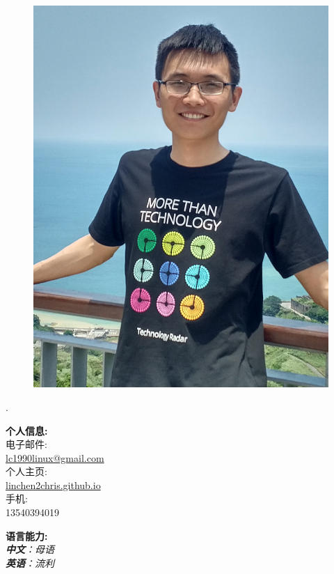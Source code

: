 \documentclass[a4paper,12pt,final]{memoir}
\newcommand{\myThemeColor}{RoyalBlue}
\newcommand{\SmallSep}{\vspace{0.9em}}
\newcommand{\CVItem}[1]
	{\textbf{\color{\myThemeColor} #1}}
\begin{document}
\begin{CJK*}{UTF8}{gbsn}%
\begin{figure}
	\hfill
	\includegraphics[width=0.7\columnwidth]{photo}
	\vspace{-7cm}
\end{figure}
\begin{flushright}\footnotesize
.\\
\vskip 6cm
    \raggedright
	\CVItem{{\large 个人信息:}}\\
	电子邮件:\\
	\href{mailto:lc1990linux@gmail.com}{lc1990linux@gmail.com}  \\
	个人主页:\\
	\href{http://linchen2chris.github.io/}{linchen2chris.github.io} \\
	手机:\\ 13540394019	
  
	\CVItem{{\large 语言能力:}}\\
  \SmallSep
	\textit{\textbf{中文}：母语 \\\textbf{英语}：流利\\}
	
	
\end{flushright}\normalsize
\framebreak



\end{CJK*}
\end{document}
